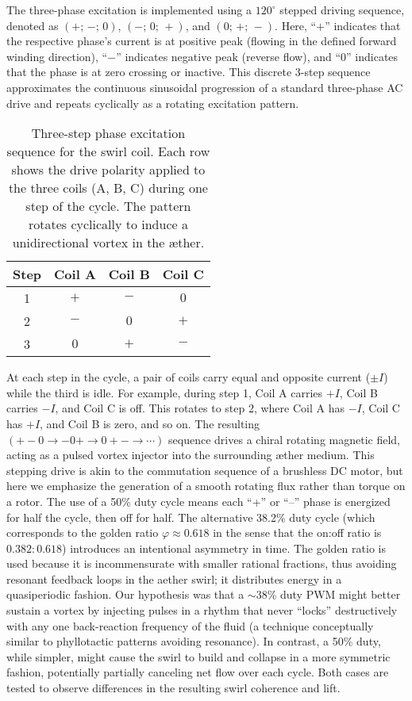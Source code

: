 \documentclass[twocolumn,aps,pre,floatfix,nofootinbib]{revtex4-2}
\begin{document}
The three-phase excitation is implemented using a $120^\circ$ stepped driving sequence, denoted as $(+;\,-;\,0)$, $(-;\,0;\,+)$, and $(0;\,+;\,-)$. Here, “\(+\)” indicates that the respective phase's current is at positive peak (flowing in the defined forward winding direction), “\(-\)” indicates negative peak (reverse flow), and “0” indicates that the phase is at zero crossing or inactive. This discrete 3-step sequence approximates the continuous sinusoidal progression of a standard three-phase AC drive and repeats cyclically as a rotating excitation pattern.

\begin{table}[h]
    \centering
    \begin{tabular}{c|c c c}
        \toprule
        \textbf{Step} & \textbf{Coil A} & \textbf{Coil B} & \textbf{Coil C} \\
        \midrule
        1 & \(+\) & \(-\) & \(0\) \\
        2 & \(-\) & \(0\) & \(+\) \\
        3 & \(0\) & \(+\) & \(-\) \\
        \bottomrule
    \end{tabular}
    \caption{Three-step phase excitation sequence for the swirl coil. Each row shows the drive polarity applied to the three coils (A, B, C) during one step of the cycle. The pattern rotates cyclically to induce a unidirectional vortex in the æther.}
    \label{tab:3-phase-steps}
\end{table}

At each step in the cycle, a pair of coils carry equal and opposite current (\(\pm I\)) while the third is idle. For example, during step 1, Coil A carries \(+I\), Coil B carries \(-I\), and Coil C is off. This rotates to step 2, where Coil A has \(-I\), Coil C has \(+I\), and Coil B is zero, and so on. The resulting $(+\!-\!0 \rightarrow -\!0\!+ \rightarrow 0\!+\!-\rightarrow \cdots)$ sequence drives a chiral rotating magnetic field, acting as a pulsed vortex injector into the surrounding æther medium.
 This stepping drive is akin to the commutation sequence of a brushless DC motor, but here we emphasize the generation of a smooth rotating flux rather than torque on a rotor. The use of a 50\% duty cycle means each “+” or “–” phase is energized for half the cycle, then off for half. The alternative 38.2\% duty cycle (which corresponds to the golden ratio $\varphi \approx 0.618$ in the sense that the on:off ratio is $0.382:0.618$) introduces an intentional asymmetry in time. The golden ratio is used because it is incommensurate with smaller rational fractions, thus avoiding resonant feedback loops in the aether swirl; it distributes energy in a quasiperiodic fashion. Our hypothesis was that a $\sim$38\% duty PWM might better sustain a vortex by injecting pulses in a rhythm that never “locks” destructively with any one back-reaction frequency of the fluid (a technique conceptually similar to phyllotactic patterns avoiding resonance). In contrast, a 50\% duty, while simpler, might cause the swirl to build and collapse in a more symmetric fashion, potentially partially canceling net flow over each cycle. Both cases are tested to observe differences in the resulting swirl coherence and lift.
\end{document}
